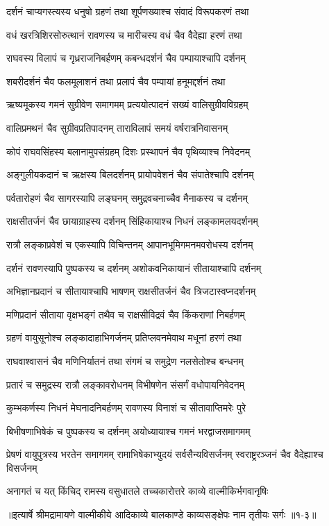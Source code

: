 \twolineshloka
{दर्शनं चाप्यगस्त्यस्य धनुषो ग्रहणं तथा}
{शूर्पणख्याश्च संवादं विरूपकरणं तथा} %

\twolineshloka
{वधं खरत्रिशिरसोरुत्थानं रावणस्य च}
{मारीचस्य वधं चैव वैदेह्या हरणं तथा} %

\twolineshloka
{राघवस्य विलापं च गृध्रराजनिबर्हणम्}
{कबन्धदर्शनं चैव पम्पायाश्चापि दर्शनम्} %

\twolineshloka
{शबरीदर्शनं चैव फलमूलाशनं तथा}
{प्रलापं चैव पम्पायां हनूमद्दर्शनं तथा} %

\twolineshloka
{ऋष्यमूकस्य गमनं सुग्रीवेण समागमम्}
{प्रत्ययोत्पादनं सख्यं वालिसुग्रीवविग्रहम्} %

\twolineshloka
{वालिप्रमथनं चैव सुग्रीवप्रतिपादनम्}
{ताराविलापं समयं वर्षरात्रनिवासनम्} %

\twolineshloka
{कोपं राघवसिंहस्य बलानामुपसंग्रहम्}
{दिशः प्रस्थापनं चैव पृथिव्याश्च निवेदनम्} %

\twolineshloka
{अङ्गुलीयकदानं च ऋक्षस्य बिलदर्शनम्}
{प्रायोपवेशनं चैव संपातेश्चापि दर्शनम्} %

\twolineshloka
{पर्वतारोहणं चैव सागरस्यापि लङ्घनम्}
{समुद्रवचनाच्चैव मैनाकस्य च दर्शनम्} %

\twolineshloka
{राक्षसीतर्जनं चैव छायाग्राहस्य दर्शनम्}
{सिंहिकायाश्च निधनं लङ्कामलयदर्शनम्} %

\twolineshloka
{रात्रौ लङ्काप्रवेशं च एकस्यापि विचिन्तनम्}
{आपानभूमिगमनमवरोधस्य दर्शनम्} %

\twolineshloka
{दर्शनं रावणस्यापि पुष्पकस्य च दर्शनम्}
{अशोकवनिकायानं सीतायाश्चापि दर्शनम्} %

\twolineshloka
{अभिज्ञानप्रदानं च सीतायाश्चापि भाषणम्}
{राक्षसीतर्जनं चैव त्रिजटास्वप्नदर्शनम्} %

\twolineshloka
{मणिप्रदानं सीताया वृक्षभङ्गं तथैव च}
{राक्षसीविद्रवं चैव किंकराणां निबर्हणम्} %

\twolineshloka
{ग्रहणं वायुसूनोश्च लङ्कादाहाभिगर्जनम्}
{प्रतिप्लवनमेवाथ मधूनां हरणं तथा} %

\twolineshloka
{राघवाश्वासनं चैव मणिनिर्यातनं तथा}
{संगमं च समुद्रेण नलसेतोश्च बन्धनम्} %

\twolineshloka
{प्रतारं च समुद्रस्य रात्रौ लङ्कावरोधनम्}
{विभीषणेन संसर्गं वधोपायनिवेदनम्} %

\twolineshloka
{कुम्भकर्णस्य निधनं मेघनादनिबर्हणम्}
{रावणस्य विनाशं च सीतावाप्तिमरेः पुरे} %

\twolineshloka
{बिभीषणाभिषेकं च पुष्पकस्य च दर्शनम्}
{अयोध्यायाश्च गमनं भरद्वाजसमागमम्} %

\threelineshloka
{प्रेषणं वायुपुत्रस्य भरतेन समागमम्}
{रामाभिषेकाभ्युदयं सर्वसैन्यविसर्जनम्}
{स्वराष्ट्ररञ्जनं चैव वैदेह्याश्च विसर्जनम्} %

\twolineshloka
{अनागतं च यत् किंचिद् रामस्य वसुधातले}
{तच्चकारोत्तरे काव्ये वाल्मीकिर्भगवानृषिः} %


॥इत्यार्षे श्रीमद्रामायणे वाल्मीकीये आदिकाव्ये बालकाण्डे काव्यसङ्क्षेपः नाम तृतीयः सर्गः ॥१-३॥
